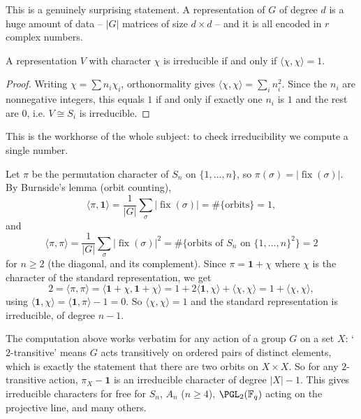 \documentclass[a4paper]{scrartcl}
\newcommand{\ip}[2]{\langle #1, #2 \rangle}
\begin{document}
This is a genuinely surprising statement. A representation of $G$ of degree $d$ is a huge amount of data -- $|G|$ matrices of size $d\times d$ -- and it is all encoded in $r$ complex numbers.

\begin{corollary}
	A representation $V$ with character $\chi$ is irreducible if and only if $\ip\chi\chi = 1$.
\end{corollary}
\begin{proof}
	Writing $\chi = \sum n_i\chi_i$, orthonormality gives $\ip\chi\chi = \sum_i n_i^2$. Since the $n_i$ are nonnegative integers, this equals $1$ if and only if exactly one $n_i$ is $1$ and the rest are $0$, i.e. $V \cong S_i$ is irreducible.
\end{proof}

This is the workhorse of the whole subject: to check irreducibility we compute a single number.

\begin{example}
	Let $\pi$ be the permutation character of $S_n$ on $\{1,\dots,n\}$, so $\pi(\sigma) = |\operatorname{fix}(\sigma)|$. By Burnside's lemma (orbit counting),
	$$\ip{\pi}{\mathbf{1}} = \frac1{|G|}\sum_\sigma |\operatorname{fix}(\sigma)| = \#\{\text{orbits}\} = 1,$$
	and
	$$\ip\pi\pi = \frac1{|G|}\sum_\sigma|\operatorname{fix}(\sigma)|^2 = \#\{\text{orbits of } S_n \text{ on } \{1,\dots,n\}^2\} = 2$$
	for $n \geq 2$ (the diagonal, and its complement). Since $\pi = \mathbf 1 + \chi$ where $\chi$ is the character of the standard representation, we get
	$$2 = \ip\pi\pi = \ip{\mathbf1 + \chi}{\mathbf 1 + \chi} = 1 + 2\ip{\mathbf1}\chi + \ip\chi\chi = 1 + \ip\chi\chi,$$
	using $\ip{\mathbf1}{\chi} = \ip{\mathbf1}{\pi} - 1 = 0$. So $\ip\chi\chi = 1$ and the standard representation is irreducible, of degree $n-1$.
\end{example}

\begin{remark}
	The computation above works verbatim for any  action of a group $G$ on a set $X$: `$2$-transitive' means $G$ acts transitively on ordered pairs of distinct elements, which is exactly the statement that there are two orbits on $X \times X$. So for any $2$-transitive action, $\pi_X - \mathbf 1$ is an irreducible character of degree $|X| - 1$. This gives irreducible characters for free for $S_n$, $A_n$ ($n\geq 4$), $\PGL_2(\F_q)$ acting on the projective line, and many others.
\end{remark}
\end{document}
